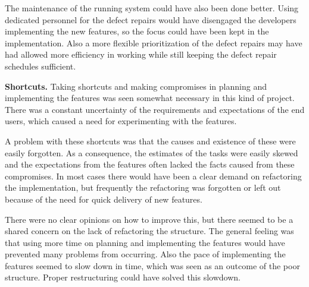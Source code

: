 The maintenance of the running system could have also been done better. Using dedicated personnel for the defect repairs would have disengaged the developers implementing the new features, so the focus could have been kept in the implementation. Also a more flexible prioritization of the defect repairs may have had allowed more efficiency in working while still keeping the defect repair schedules sufficient.










\textbf{Shortcuts.} Taking shortcuts and making compromises in planning and implementing the features was seen somewhat necessary in this kind of project. There was a constant uncertainty of the requirements and expectations of the end users, which caused a need for experimenting with the features.

A problem with these shortcuts was that the causes and existence of these were easily forgotten. As a consequence, the estimates of the tasks were easily skewed and the expectations from the features often lacked the facts caused from these compromises. In most cases there would have been a clear demand on refactoring the implementation, but frequently the refactoring was forgotten or left out because of the need for quick delivery of new features.

There were no clear opinions on how to improve this, but there seemed to be a shared concern on the lack of refactoring the structure. The general feeling was that using more time on planning and implementing the features would have prevented many problems from occurring. Also the pace of implementing the features seemed to slow down in time, which was seen as an outcome of the poor structure. Proper restructuring could have solved this slowdown.

